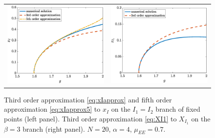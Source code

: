 \documentclass[reqno]{siamonline190516}
\begin{document}
\begin{figure}
    \centering
    \begin{tabular}{cc}
    \includegraphics[width=7.8cm]{images/Xiapprox.eps} &
    \includegraphics[width=7.8cm]{images/Xiapproxbeta3.eps} 
    \end{tabular}
    \caption{Third order approximation \cref{eq:xIapprox} and fifth order approximation \cref{eq:xIapprox5} to $x_I$ on the $I_1=I_2$ branch of fixed points (left panel). Third order approximation \cref{eq:XI1} to $X_{I_1}$ on the $\beta=3$ branch (right panel). $N = 20$,  $\alpha = 4$, $\mu_{EE} = 0.7$.}
    \label{fig:xIapprox}
\end{figure}
\end{document}
